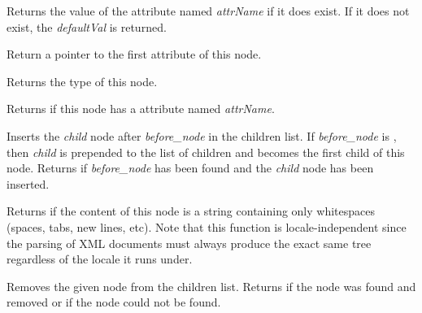 
Returns the value of the attribute named {\it attrName} if it does exist.
If it does not exist, the {\it defaultVal} is returned.

\label{wxxmlnodegetattributes}


Return a pointer to the first attribute of this node.

\label{wxxmlnodegettype}


Returns the type of this node.


\label{wxxmlnodehasattribute}


Returns \true if this node has a attribute named {\it attrName}.

\label{wxxmlnodeinsertchild}


Inserts the {\it child} node after {\it before\_node} in the children list.
If {\it before\_node} is \NULL, then {\it child} is prepended to the list of children and
becomes the first child of this node.
Returns \true if {\it before\_node} has been found and the {\it child} node has been inserted.

\label{wxxmlnodecontainsiswhitespaceonly}


Returns \true if the content of this node is a string containing only whitespaces (spaces,
tabs, new lines, etc). Note that this function is locale-independent since the parsing of XML
documents must always produce the exact same tree regardless of the locale it runs under.

\label{wxxmlnoderemovechild}


Removes the given node from the children list. Returns \true if the node was found and removed
or \false if the node could not be found.

